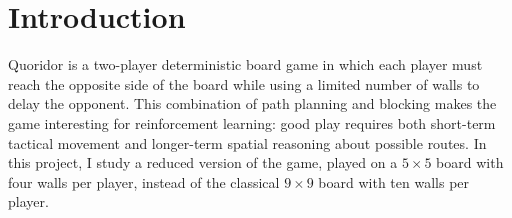 \documentclass{article}
\begin{document}



\begin{abstract}
%
This experiment investigates whether an AlphaZero-style reinforcement learning pipeline can learn to play a smaller version of the board game Quoridor. In Quoridor, two players race to reach the opposite side of the board while placing walls to slow down the opponent. The agent is trained from self-play using Monte Carlo Tree Search guided by a convolutional policy-value network. Starting from an untrained policy, the agent learns movement and wall-placement strategies through repeated self-play games. The experiments focus on how search and exploration choices influence learning stability, game length, and stalled positions. The final agents exhibit meaningful strategic behavior.
%
\end{abstract}

\section{Introduction}

Quoridor is a two-player deterministic board game in which each player must
reach the opposite side of the board while using a limited number of walls to
delay the opponent. This combination of path planning and blocking makes the
game interesting for reinforcement learning: good play requires both short-term
tactical movement and longer-term spatial reasoning about possible routes. In
this project, I study a reduced version of the game, played on a \(5 \times 5\)
board with four walls per player, instead of the classical \(9 \times 9\) board
with ten walls per player.
\end{document}
